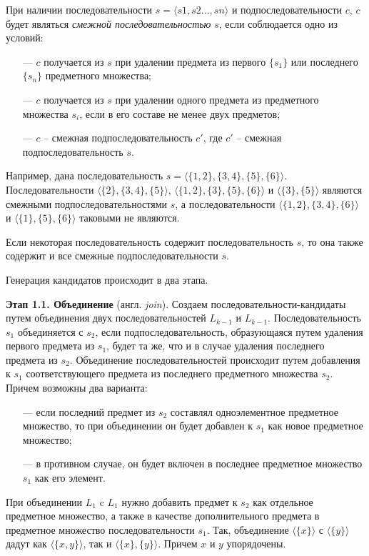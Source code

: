 При наличии последовательности $s = \langle s1, s2..., sn \rangle$ и подпоследовательности $c$, $c$ будет являться \textit{смежной последовательностью} $s$, если соблюдается одно из условий:
\begin{itemize}
	\item[---] $c$ получается из $s$ при удалении предмета из первого $\{s_1\}$ или последнего $\{s_n\}$ предметного множества;
	\item[---] $c$ получается из $s$ при удалении одного предмета из предметного множества $s_i$, если в его составе не менее двух предметов;
	\item[---] $c$ – смежная подпоследовательность $c'$, где $c'$ – смежная подпоследовательность $s$.
\end{itemize}

Например, дана последовательность $s = \langle\{1,2\},\{3,4\},\{5\},\{6\}\rangle$. Последовательности $\langle\{2\},\{3,4\},\{5\}\rangle$, $\langle\{1,2\},\{3\},\{5\},\{6\}\rangle$ и $\langle\{3\},\{5\}\rangle$ являются смежными подпоследовательностями $s$, а последовательности $\langle\{1,2\},\{3,4\},\{6\}\rangle$ и $\langle\{1\},\{5\},\{6\}\rangle$ таковыми не являются.

Если некоторая последовательность содержит последовательность $s$, то она также содержит и все смежные подпоследовательности $s$.

Генерация кандидатов происходит в два этапа.

\textbf{Этап 1.1. Объединение} (англ. \textit{join}). Создаем последовательности-кандидаты путем объединения двух последовательностей $L_{k−1}$ и $L_{k−1}$. Последовательность $s_1$ объединяется с $s_2$, если подпоследовательность, образующаяся путем удаления первого предмета из $s_1$, будет та же, что и в случае удаления последнего предмета из $s_2$. Объединение последовательностей происходит путем добавления к $s_1$ соответствующего предмета из последнего предметного множества $s_2$. Причем возможны два варианта:
\begin{itemize}
	\item[---] если последний предмет из $s_2$ составлял одноэлементное предметное множество, то при объединении он будет добавлен к $s_1$ как новое предметное множество;
	\item[---] в противном случае, он будет включен в последнее предметное множество $s_1$ как его элемент.
\end{itemize}

При объединении $L_1$ c $L_1$ нужно добавить предмет к $s_2$ как отдельное предметное множество, а также в качестве дополнительного предмета в предметное множество последовательности $s_1$. Так, объединение $\langle\{x\}\rangle$ с $\langle\{y\}\rangle$ дадут как $\langle\{x, y\}\rangle$, так и $\langle\{x\},\{y\}\rangle$. Причем $x$ и $y$ упорядочены.

